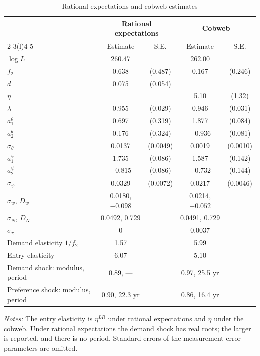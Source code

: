 \documentclass[12pt]{article}
\begin{document}
\begin{table}[!htb]
\centering
\caption{Rational-expectations and cobweb estimates}\label{tab:cobweb}
\small
\renewcommand{\arraystretch}{0.9}
\begin{tabular}{@{}lcccc@{}}
\toprule
 & \multicolumn{2}{c}{Rational expectations} & \multicolumn{2}{c}{Cobweb} \\
\cmidrule(lr){2-3}\cmidrule(l){4-5}
 & Estimate & S.E. & Estimate & S.E. \\
\midrule
$\log L$ & 260.47 & & 262.00 & \\[2pt]
$f_2$ & 0.638 & (0.487) & 0.167 & (0.246) \\
$d$ & 0.075 & (0.054) & & \\
$\eta$ & & & 5.10 & (1.32) \\
$\lambda$ & 0.955 & (0.029) & 0.946 & (0.031) \\[2pt]
$a^{\theta}_1$ & 0.697 & (0.319) & 1.877 & (0.084) \\
$a^{\theta}_2$ & 0.176 & (0.324) & $-0.936$ & (0.081) \\
$\sigma_\theta$ & 0.0137 & (0.0049) & 0.0019 & (0.0010) \\
$a^{\psi}_1$ & 1.735 & (0.086) & 1.587 & (0.142) \\
$a^{\psi}_2$ & $-0.815$ & (0.086) & $-0.732$ & (0.144) \\
$\sigma_\psi$ & 0.0329 & (0.0072) & 0.0217 & (0.0046) \\[2pt]
$\sigma_w$, $D_w$ & 0.0180, $-0.098$ & & 0.0214, $-0.052$ & \\
$\sigma_N$, $D_N$ & 0.0492, 0.729 & & 0.0491, 0.729 & \\
$\sigma_\pi$ & 0 & & 0.0037 & \\
\midrule
Demand elasticity $1/f_2$ & 1.57 & & 5.99 & \\
Entry elasticity & 6.07 & & 5.10 & \\
Demand shock: modulus, period & 0.89, --- & & 0.97, 25.5 yr & \\
Preference shock: modulus, period & 0.90, 22.3 yr & & 0.86, 16.4 yr & \\
\bottomrule
\end{tabular}
\par\medskip
\begin{minipage}{0.85\linewidth}\footnotesize
\textit{Notes:} The entry elasticity is $\eta^{LR}$ under rational expectations and $\eta$ under the cobweb. Under rational expectations the demand shock has real roots; the larger is reported, and there is no period. Standard errors of the measurement-error parameters are omitted.
\end{minipage}
\end{table}
\end{document}
